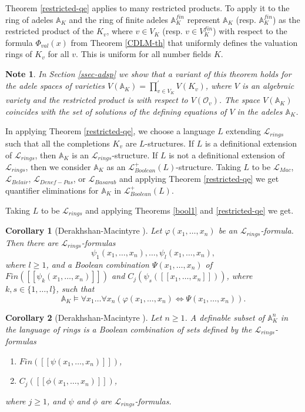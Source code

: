 \documentclass[12pt]{amsart}
\def\A{\mathbb{A}}
\def\cL{\mathcal{L}}
\def\cL{\mathcal{L}}
\newtheorem{cor}{Corollary}[section]
\numberwithin{equation}{section}
\newtheorem{note}{Note}[section]
\begin{document}
Theorem \ref{restricted-qe} applies to many restricted products. To apply it to 
the ring of adeles $\A_K$ and the ring of finite adeles $\A_K^{fin}$ represent 
$\A_K$ (resp. $\A_K^{fin}$) as the restricted product of the $K_v$, where $v\in V_K$ (resp. $v\in V_K^{fin}$) with respect to the formula $\Phi_{val}(x)$ from Theorem \ref{CDLM-th} that uniformly defines the valuation rings of $K_v$ for all $v$. This is uniform for all number fields $K$.

\begin{note} In Section \ref{ssec-adsp} we show that a variant of this theorem holds for the adele spaces of varieties 
$V(\A_K)=\prod^{'}_{v\in V_K} V(K_v)$, where $V$ is an algebraic variety 
and the restricted product is with respect to $V(\mathcal{O}_v)$. The space $V(\A_K)$ coincides with the set of solutions of the defining equations of $V$ in the adeles $\A_K$.\end{note}

In applying Theorem \ref{restricted-qe}, we choose a language $L$ extending $\cL_{rings}$ such that 
all the completions $K_v$ are $L$-structures. If $L$ is a definitional extension of $\cL_{rings}$, then 
$\A_K$ is an $\cL_{rings}$-structure. If $L$ is not a definitional extension of $\cL_{rings}$, then we  
consider $\A_K$ as an $\cL_{Boolean}^+(L)$-structure. Taking $L$ to be $\cL_{Mac}$, $\cL_{Belair}$, $\cL_{Denef-Pas}$, or $\cL_{Basarab}$ and applying Theorem \ref{restricted-qe} we get quantifier eliminations for $\A_K$ in $\cL_{Boolean}^+(L)$. 

Taking $L$ to be $\cL_{rings}$ and applying Theorems \ref{bool1} and \ref{restricted-qe} we get.
\begin{cor}[Derakhshan-Macintyre \cite{DM-ad}]\label{qe-fin}Let $\varphi(x_1,\dots,x_n)$ be an $\cL_{rings}$-formula. Then there are $\cL_{rings}$-formulas 
$$\psi_1(x_1,\dots,x_n),\dots,\psi_l(x_1,\dots,x_n),$$
where $l\geq 1$, and a Boolean combination $\Psi(x_1,\dots,x_n)$ 
of $Fin([[\psi_k(x_1,\dots,x_n)]])$ and 
$C_j(\psi_s([[x_1,\dots,x_n]]))$, where $k,s \in \{1,\dots,l\}$, such that 
$$\A_K \models \forall x_1 \dots \forall x_n (\varphi(x_1,\dots,x_n) \Leftrightarrow \Psi(x_1,\dots,x_n)).$$
\end{cor}

\begin{cor}[Derakhshan-Macintyre \cite{DM-ad}]\label{def-ring} Let $n\geq 1$. A definable subset of $\A_K^n$ in the language of rings is a Boolean combination of sets defined by the $\cL_{rings}$-formulas
\begin{enumerate}
\item $Fin([[\psi(x_1,\dots,x_n)]])$,
\item $C_j([[\phi(x_1,\dots,x_n)]])$, 
\end{enumerate}
where $j\geq 1$, and $\psi$ and $\phi$ are $\cL_{rings}$-formulas.
\end{cor}
\end{document}
